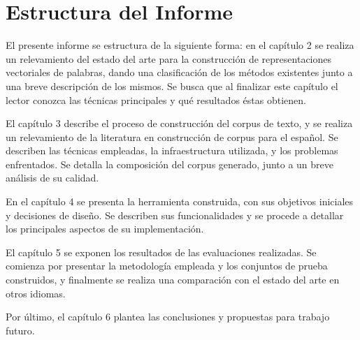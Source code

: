 \section{Estructura del Informe}

El presente informe se estructura de la siguiente forma: en el capítulo 2 se realiza un relevamiento
del estado del arte para la construcción de representaciones vectoriales de palabras, dando una
clasificación de los métodos existentes junto a una breve descripción de los mismos. Se busca que al
finalizar este capítulo el lector conozca las técnicas principales y qué resultados éstas obtienen.

El capítulo 3 describe el proceso de construcción del corpus de texto, y se realiza un relevamiento
de la literatura en construcción de corpus para el español. Se describen las técnicas empleadas, la
infraestructura utilizada, y los problemas enfrentados. Se detalla la composición del corpus
generado, junto a un breve análisis de su calidad.

En el capítulo 4 se presenta la herramienta construida, con sus objetivos iniciales y decisiones de
diseño. Se describen sus funcionalidades y se procede a detallar los principales aspectos de su
implementación.

El capítulo 5 se exponen los resultados de las evaluaciones realizadas. Se comienza por presentar la
metodología empleada y los conjuntos de prueba construidos, y finalmente se realiza una comparación
con el estado del arte en otros idiomas.

Por último, el capítulo 6 plantea las conclusiones y propuestas para trabajo futuro.
